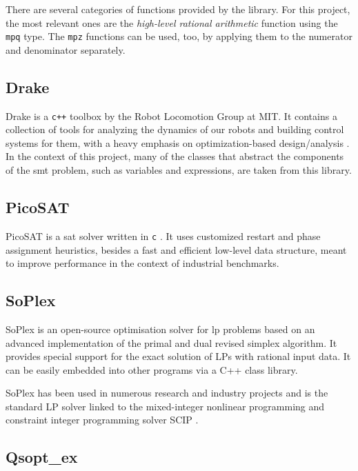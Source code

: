 There are several categories of functions provided by the library.
For this project, the most relevant ones are the \textit{high-level rational arithmetic} function using the \texttt{mpq} type.
The \texttt{mpz} functions can be used, too, by applying them to the numerator and denominator separately.

\subsection*{Drake}

Drake is a \texttt{c++} toolbox by the Robot Locomotion Group at MIT.
It contains a collection of tools for analyzing the dynamics of our robots and building control systems for them, with a heavy emphasis on optimization-based design/analysis \cite{paper:drake}.
In the context of this project, many of the classes that abstract the components of the \gls{smt} problem, such as variables and expressions, are taken from this library.

\subsection*{PicoSAT}

PicoSAT is a \gls{sat} solver written in \texttt{c} \cite{paper:picosat}.
It uses customized restart and phase assignment heuristics, besides a fast and efficient low-level data structure, meant to improve performance in the context of industrial benchmarks.

\subsection*{SoPlex}

SoPlex is an open-source optimisation solver for \gls{lp} problems based on an advanced implementation of the primal and dual revised simplex algorithm.
It provides special support for the exact solution of LPs with rational input data.
It can be easily embedded into other programs via a C++ class library.

SoPlex has been used in numerous research and industry projects and is the standard LP solver linked to the mixed-integer nonlinear programming and constraint integer programming solver SCIP \cite{man:soplex}.

\subsection*{Qsopt\_ex}

